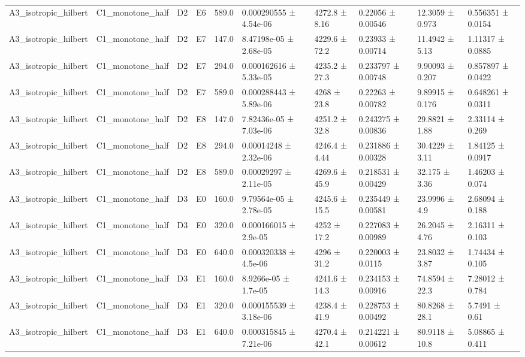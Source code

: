 \begin{table}
\begin{tabular}{llllllllll}
A3\_isotropic\_hilbert & C1\_monotone\_half & D2 & E6 & 589.0 & 0.000290555 ± 4.54e-06 & 4272.8 ± 8.16 & 0.22056 ± 0.00546 & 12.3059 ± 0.973 & 0.556351 ± 0.0154 \\
A3\_isotropic\_hilbert & C1\_monotone\_half & D2 & E7 & 147.0 & 8.47198e-05 ± 2.68e-05 & 4229.6 ± 72.2 & 0.23933 ± 0.00714 & 11.4942 ± 5.13 & 1.11317 ± 0.0885 \\
A3\_isotropic\_hilbert & C1\_monotone\_half & D2 & E7 & 294.0 & 0.000162616 ± 5.33e-05 & 4235.2 ± 27.3 & 0.233797 ± 0.00748 & 9.90093 ± 0.207 & 0.857897 ± 0.0422 \\
A3\_isotropic\_hilbert & C1\_monotone\_half & D2 & E7 & 589.0 & 0.000288443 ± 5.89e-06 & 4268 ± 23.8 & 0.22263 ± 0.00782 & 9.89915 ± 0.176 & 0.648261 ± 0.0311 \\
A3\_isotropic\_hilbert & C1\_monotone\_half & D2 & E8 & 147.0 & 7.82436e-05 ± 7.03e-06 & 4251.2 ± 32.8 & 0.243275 ± 0.00836 & 29.8821 ± 1.88 & 2.33114 ± 0.269 \\
A3\_isotropic\_hilbert & C1\_monotone\_half & D2 & E8 & 294.0 & 0.00014248 ± 2.32e-06 & 4246.4 ± 4.44 & 0.231886 ± 0.00328 & 30.4229 ± 3.11 & 1.84125 ± 0.0917 \\
A3\_isotropic\_hilbert & C1\_monotone\_half & D2 & E8 & 589.0 & 0.00029297 ± 2.11e-05 & 4269.6 ± 45.9 & 0.218531 ± 0.00429 & 32.175 ± 3.36 & 1.46203 ± 0.074 \\
A3\_isotropic\_hilbert & C1\_monotone\_half & D3 & E0 & 160.0 & 9.79564e-05 ± 2.78e-05 & 4245.6 ± 15.5 & 0.235449 ± 0.00581 & 23.9996 ± 4.9 & 2.68094 ± 0.188 \\
A3\_isotropic\_hilbert & C1\_monotone\_half & D3 & E0 & 320.0 & 0.000166015 ± 2.9e-05 & 4252 ± 17.2 & 0.227083 ± 0.00989 & 26.2045 ± 4.76 & 2.16311 ± 0.103 \\
A3\_isotropic\_hilbert & C1\_monotone\_half & D3 & E0 & 640.0 & 0.000320338 ± 4.5e-06 & 4296 ± 31.2 & 0.220003 ± 0.0115 & 23.8032 ± 3.87 & 1.74434 ± 0.105 \\
A3\_isotropic\_hilbert & C1\_monotone\_half & D3 & E1 & 160.0 & 8.9266e-05 ± 1.7e-05 & 4241.6 ± 14.3 & 0.234153 ± 0.00916 & 74.8594 ± 22.3 & 7.28012 ± 0.784 \\
A3\_isotropic\_hilbert & C1\_monotone\_half & D3 & E1 & 320.0 & 0.000155539 ± 3.18e-06 & 4238.4 ± 41.9 & 0.228753 ± 0.00492 & 80.8268 ± 28.1 & 5.7491 ± 0.61 \\
A3\_isotropic\_hilbert & C1\_monotone\_half & D3 & E1 & 640.0 & 0.000315845 ± 7.21e-06 & 4270.4 ± 42.1 & 0.214221 ± 0.00612 & 80.9118 ± 10.8 & 5.08865 ± 0.411 \\

\end{tabular}
\end{table}
